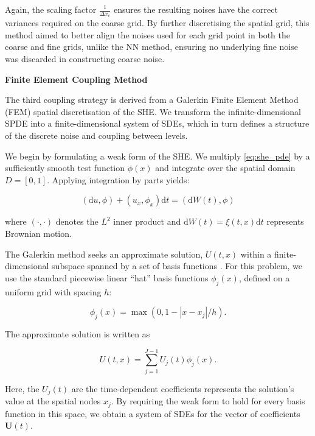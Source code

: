 Again, the scaling factor
$\frac{1}{\Delta x_c}$ ensures the resulting
noises have the correct variances required on 
the coarse grid. 
By further discretising the spatial grid, 
this method aimed to better align the noises 
used for each grid point in both the coarse
and fine grids, unlike the NN method, ensuring
no underlying fine noise was discarded in 
constructing coarse noise.
\newline

\textbf{Finite Element Coupling Method}

The third coupling strategy is derived from a Galerkin Finite Element Method
(FEM) \cite{suli2025fe} spatial discretisation of the SHE. We transform 
the infinite-dimensional SPDE into a finite-dimensional system of SDEs, 
which in turn defines a structure of the discrete noise and coupling between 
levels.

We begin by formulating a weak form of the SHE. We multiply \eqref{eq:she_pde} by 
a sufficiently smooth test function $\phi(x)$ and integrate over the spatial domain 
$D = [0,1]$. Applying integration by parts yields:

\begin{equation}\label{eq:she_differential_form}
    (\mathrm{d}u,\phi) + (u_x, \phi_x)\mathrm{d}t = (\mathrm{d}W(t), \phi)
\end{equation}

where $(\cdot, \cdot)$ denotes the $L^2$ inner product and  
$\mathrm{d}W(t) = \xi(t,x)\mathrm{d}t$ represents Brownian
motion.

The Galerkin method seeks an approximate solution, $U(t,x)$ within a finite-dimensional
subspace spanned by a set of basis functions \cite{suli2025fe}. For this problem, 
we use the standard piecewise linear ``hat'' basis functions $\phi_j(x)$, defined on a 
uniform grid with spacing $h$:

\begin{equation*}
    \phi_j(x) = \max(0, 1 - |x-x_j|/ h).
\end{equation*}

The approximate solution is written as

\begin{equation*}
    U(t,x) = \sum_{j=1}^{J-1}U_j(t)\phi_j(x).
\end{equation*}

Here, the $U_j(t)$ are the time-dependent coefficients represents the solution's value at
the spatial nodes $x_j$. By requiring the weak form to hold for every basis function 
in this space, we obtain a system of SDEs for the vector of coefficients $\mathbf{U}(t)$. 

